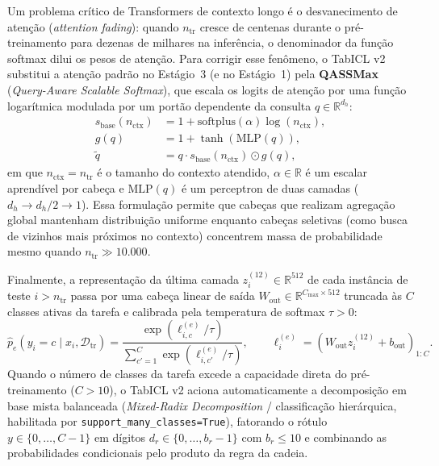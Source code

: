 \documentclass[11pt,a4paper]{article}
\begin{document}
Um problema crítico de Transformers de contexto longo é o desvanecimento de atenção (\emph{attention fading}): quando $n_{\mathrm{tr}}$ cresce de centenas durante o pré-treinamento para dezenas de milhares na inferência, o denominador da função softmax dilui os pesos de atenção. Para corrigir esse fenômeno, o TabICL v2 substitui a atenção padrão no Estágio~3 (e no Estágio~1) pela \textbf{QASSMax} (\emph{Query-Aware Scalable Softmax}), que escala os logits de atenção por uma função logarítmica modulada por um portão dependente da consulta $q \in \mathbb{R}^{d_h}$:
\begin{align}
    s_{\mathrm{base}}(n_{\mathrm{ctx}}) &= 1 + \mathrm{softplus}(\alpha) \log(n_{\mathrm{ctx}}), \label{eq:qassmax_base} \\
    g(q) &= 1 + \tanh(\mathrm{MLP}(q)), \label{eq:qassmax_gate} \\
    \tilde{q} &= q \cdot s_{\mathrm{base}}(n_{\mathrm{ctx}}) \odot g(q), \label{eq:qassmax_query}
\end{align}
em que $n_{\mathrm{ctx}} = n_{\mathrm{tr}}$ é o tamanho do contexto atendido, $\alpha \in \mathbb{R}$ é um escalar aprendível por cabeça e $\mathrm{MLP}(q)$ é um perceptron de duas camadas ($d_h \to d_h/2 \to 1$). Essa formulação permite que cabeças que realizam agregação global mantenham distribuição uniforme enquanto cabeças seletivas (como busca de vizinhos mais próximos no contexto) concentrem massa de probabilidade mesmo quando $n_{\mathrm{tr}} \gg 10.000$.

Finalmente, a representação da última camada $z_i^{(12)} \in \mathbb{R}^{512}$ de cada instância de teste $i > n_{\mathrm{tr}}$ passa por uma cabeça linear de saída $W_{\mathrm{out}} \in \mathbb{R}^{C_{\max} \times 512}$ truncada às $C$ classes ativas da tarefa e calibrada pela temperatura de softmax $\tau > 0$:
\begin{equation}
    \hat{p}_e(y_i = c \mid x_i, \mathcal{D}_{\mathrm{tr}}) = \frac{\exp\!\left(\ell_{i,c}^{(e)} / \tau\right)}{\sum_{c'=1}^{C} \exp\!\left(\ell_{i,c'}^{(e)} / \tau\right)}, \qquad \ell_i^{(e)} = \left(W_{\mathrm{out}} z_i^{(12)} + b_{\mathrm{out}}\right)_{1:C}.
    \label{eq:softmax_temp}
\end{equation}
Quando o número de classes da tarefa excede a capacidade direta do pré-treinamento ($C > 10$), o TabICL v2 aciona automaticamente a decomposição em base mista balanceada (\emph{Mixed-Radix Decomposition} / classificação hierárquica, habilitada por \texttt{support\_many\_classes=True}), fatorando o rótulo $y \in \{0, \dots, C-1\}$ em dígitos $d_r \in \{0, \dots, b_r - 1\}$ com $b_r \le 10$ e combinando as probabilidades condicionais pelo produto da regra da cadeia.
\end{document}
